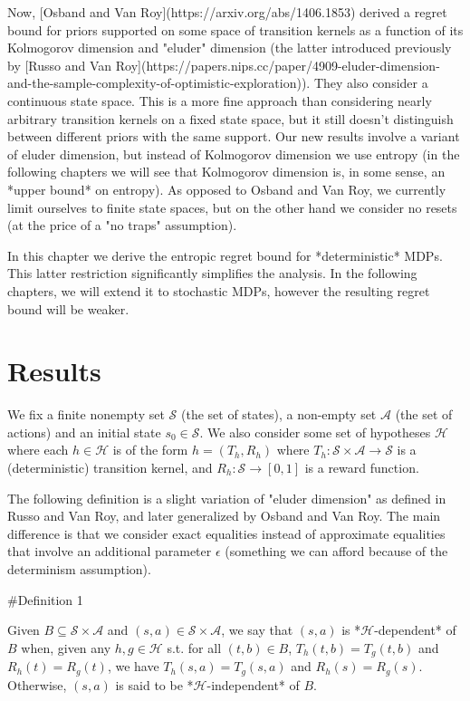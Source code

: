 \documentclass[a4paper]{article}
\newcommand{\AP}[1]{\left(#1\right)}
\newcommand{\A}{\mathcal{A}}
\newcommand{\St}{\mathcal{S}}
\newcommand{\Hy}{\mathcal{H}}
\begin{document}
Now, [Osband and Van Roy](https://arxiv.org/abs/1406.1853) derived a regret bound for priors supported on some space of transition kernels as a function of its Kolmogorov dimension and "eluder" dimension (the latter introduced previously by [Russo and Van Roy](https://papers.nips.cc/paper/4909-eluder-dimension-and-the-sample-complexity-of-optimistic-exploration)). They also consider a continuous state space. This is a more fine approach than considering nearly arbitrary transition kernels on a fixed state space, but it still doesn't distinguish between different priors with the same support. Our new results involve a variant of eluder dimension, but instead of Kolmogorov dimension we use entropy (in the following chapters we will see that Kolmogorov dimension is, in some sense, an *upper bound* on entropy). As opposed to Osband and Van Roy, we currently limit ourselves to finite state spaces, but on the other hand we consider no resets (at the price of a "no traps" assumption).

In this chapter we derive the entropic regret bound for *deterministic* MDPs. This latter restriction significantly simplifies the analysis. In the following chapters, we will extend it to stochastic MDPs, however the resulting regret bound will be weaker.

\section{Results}

We fix a finite nonempty set $\St$ (the set of states), a non-empty set $\A$ (the set of actions) and an initial state $s_0 \in \St$. We also consider some set of hypotheses $\Hy$ where each $h\in\Hy$ is of the form $h=\AP{T_h,R_h}$ where $T_h: \St \times \A \rightarrow \St$ is a (deterministic) transition kernel, and $R_h: \St \rightarrow [0,1]$ is a reward function.

The following definition is a slight variation of "eluder dimension" as defined in Russo and Van Roy, and later generalized by Osband and Van Roy. The main difference is that we consider exact equalities instead of approximate equalities that involve an additional parameter $\epsilon$ (something we can afford because of the determinism assumption).

\#Definition 1

Given $B \subseteq \St \times \A$ and $(s,a) \in \St \times \A$, we say that $(s,a)$ is *$\Hy$-dependent* of $B$ when, given any $h,g\in\Hy$ s.t. for all $(t,b) \in B$, $T_h(t,b) = T_g(t,b)$ and $R_h(t) = R_g(t)$, we have $T_h(s,a)=T_g(s,a)$ and $R_h(s)=R_g(s)$. Otherwise, $(s,a)$ is said to be *$\Hy$-independent* of $B$.
\end{document}
